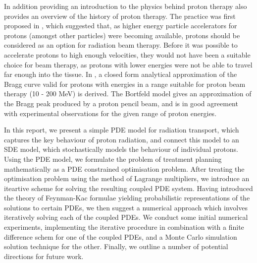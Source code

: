 In addition providing an introduction to the physics behind proton therapy \cite{newhauser2015physics} also provides an overview of the history of proton therapy. The practice was first proposed in \cite{wilson1946radiological}, which suggested that, as higher energy particle accelerators for protons (amongst other particles) were becoming available, protons should be considered as an option for radiation beam therapy. Before it was possible to accelerate protons to high enough velocities, they would not have been a suitable choice for beam therapy, as protons with lower energies were not be able to travel far enough into the tissue. In \cite{bortfeld1997analytical}, a closed form analytical approximation of the Bragg curve valid for protons with energies in a range suitable for proton beam therapy (10 - 200 MeV) is derived. The Bortfeld model gives an approximation of the Bragg peak produced by a proton pencil beam, and is in good agreement with experimental observations for the given range of proton energies. 

In this report, we present a simple PDE model for radiation transport, which captures the key behaviour of proton radiation, and connect this model to an SDE model, which stochastically models the behaviour of individual protons. Using the PDE model, we formulate the problem of treatment planning mathematically as a PDE constrained optimisation problem. After treating the optimisation problem using the method of Lagrange multipliers, we introduce an iteartive scheme for solving the resulting coupled PDE system. Having introduced the theory of Feynman-Kac formulae yielding probabilistic representations of the solutions to certain PDEs, we then suggest a numerical approach which involves iteratively solving each of the coupled PDEs. We conduct some initial numerical experiments, implementing the iterative procedure in combination with a finite difference schem for one of the coupled PDEs, and a Monte Carlo simulation solution technique for the other. Finally, we outline a number of potential directions for future work.